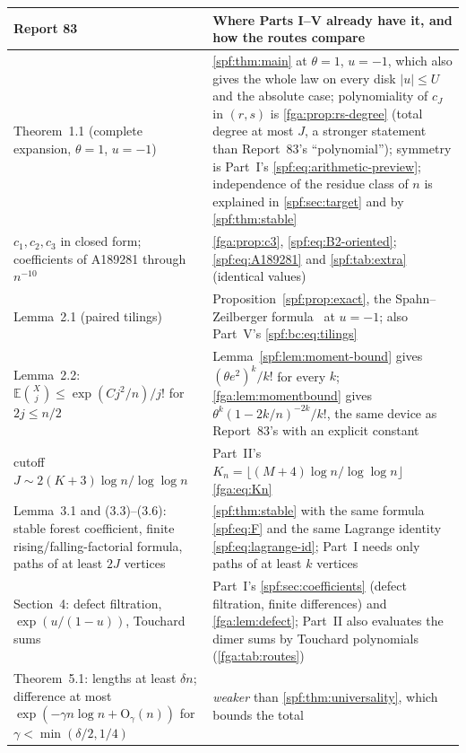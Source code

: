 \documentclass[11pt]{article}
\numberwithin{equation}{section}
\theoremstyle{definition}
\theoremstyle{remark}
\theoremstyle{definition}
\newcommand{\E}{\mathbb E}
\newcommand{\bigO}{\mathrm O}
\begin{document}
\begin{table}[htbp]
\centering\small
\renewcommand{\arraystretch}{1.12}
\begin{tabular}{@{}>{\raggedright\arraybackslash}p{}>{\raggedright\arraybackslash}p{}@{}}
\toprule
Report 83 & Where Parts I--V already have it, and how the routes compare\\
\midrule
Theorem~1.1 (complete expansion, $\theta=1$, $u=-1$) &
\cref{spf:thm:main} at $\theta=1$, $u=-1$, which also gives the whole law
on every disk $|u|\le U$ and the absolute case; polynomiality of $c_J$ in
$(r,s)$ is \cref{fga:prop:rs-degree} (total degree at most $J$, a stronger
statement than Report~83's ``polynomial''); symmetry is
Part~I's \eqref{spf:eq:arithmetic-preview}; independence of the residue class
of $n$ is explained in \cref{spf:sec:target} and by \cref{spf:thm:stable}\\
$c_1,c_2,c_3$ in closed form; coefficients of A189281 through $n^{-10}$ &
\cref{fga:prop:c3}, \eqref{spf:eq:B2-oriented}; \eqref{spf:eq:A189281} and
\cref{spf:tab:extra} (identical values)\\
Lemma~2.1 (paired tilings) &
Proposition~\ref{spf:prop:exact}, the Spahn--Zeilberger formula~\cite{spahn}
at $u=-1$; also Part~V's \eqref{spf:bc:eq:tilings}\\
Lemma~2.2: $\E\binom Xj\le\exp(Cj^2/n)/j!$ for $2j\le n/2$ &
Lemma~\ref{spf:lem:moment-bound} gives $(\theta e^2)^k/k!$ for every $k$;
\cref{fga:lem:momentbound} gives $\theta^k(1-2k/n)^{-2k}/k!$, the same
device as Report~83's with an explicit constant\\
cutoff $J\sim2(K+3)\log n/\log\log n$ &
Part~II's $K_n=\lfloor(M+4)\log n/\log\log n\rfloor$ \eqref{fga:eq:Kn}\\
Lemma~3.1 and (3.3)--(3.6): stable forest coefficient, finite
rising/falling-factorial formula, paths of at least $2J$ vertices &
\cref{spf:thm:stable} with the same formula \eqref{spf:eq:F} and the same
Lagrange identity \eqref{spf:eq:lagrange-id}; Part~I needs only paths of
at least $k$ vertices\\
Section~4: defect filtration, $\exp(u/(1-u))$, Touchard sums &
Part~I's \cref{spf:sec:coefficients} (defect filtration, finite
differences) and \cref{fga:lem:defect}; Part~II also evaluates the dimer
sums by Touchard polynomials (\cref{fga:tab:routes})\\
Theorem~5.1: lengths at least $\delta n$; difference at most
$\exp(-\gamma n\log n+\bigO_\gamma(n))$ for $\gamma<\min(\delta/2,1/4)$ &
\emph{weaker} than \cref{spf:thm:universality}, which bounds the total

\end{tabular}
\end{table}
\end{document}
